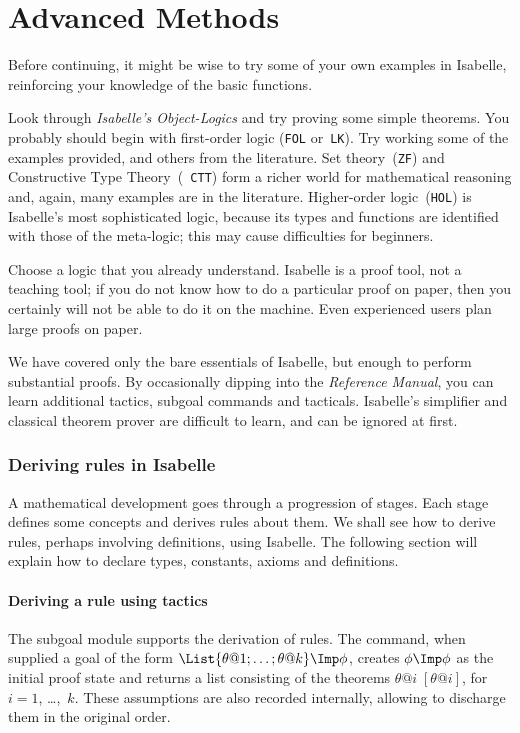 \part{Advanced Methods}
Before continuing, it might be wise to try some of your own examples in
Isabelle, reinforcing your knowledge of the basic functions.

Look through {\em Isabelle's Object-Logics\/} and try proving some simple
theorems.  You probably should begin with first-order logic ({\tt FOL}
or~{\tt LK}).  Try working some of the examples provided, and others from
the literature.  Set theory~({\tt ZF}) and Constructive Type Theory~({\tt
  CTT}) form a richer world for mathematical reasoning and, again, many
examples are in the literature.  Higher-order logic~({\tt HOL}) is
Isabelle's most sophisticated logic, because its types and functions are
identified with those of the meta-logic; this may cause difficulties for
beginners.

Choose a logic that you already understand.  Isabelle is a proof
tool, not a teaching tool; if you do not know how to do a particular proof
on paper, then you certainly will not be able to do it on the machine.
Even experienced users plan large proofs on paper.

We have covered only the bare essentials of Isabelle, but enough to perform
substantial proofs.  By occasionally dipping into the {\em Reference
Manual}, you can learn additional tactics, subgoal commands and tacticals.
Isabelle's simplifier and classical theorem prover are
difficult to learn, and can be ignored at first.


\section{Deriving rules in Isabelle}
A mathematical development goes through a progression of stages.  Each
stage defines some concepts and derives rules about them.  We shall see how
to derive rules, perhaps involving definitions, using Isabelle.  The
following section will explain how to declare types, constants, axioms and
definitions.


\subsection{Deriving a rule using tactics} \label{deriving-example}
The subgoal module supports the derivation of rules.  The 
command, when supplied a goal of the form $\List{\theta@1; \ldots;
\theta@k} \Imp \phi$, creates $\phi\Imp\phi$ as the initial proof state and
returns a list consisting of the theorems 
${\theta@i\;[\theta@i]}$, for $i=1$, \ldots,~$k$.  These assumptions are
also recorded internally, allowing  to discharge them in the
original order.

